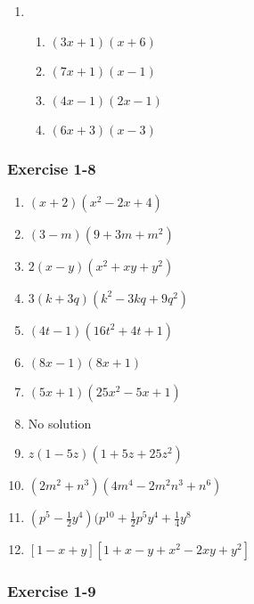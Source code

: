 {\begin{multicols}{3}
\begin{enumerate}[noitemsep, label=\textbf{\arabic*}. ]
\item %

\begin{enumerate}[noitemsep, label=\textbf{(\alph*)} ] 
\item $(3x + 1)(x + 6)$%
\item $(7x + 1)(x - 1)$%
\item $(4x - 1)(2x - 1)$%
\item $(6x + 3)(x - 3)$%
\end{enumerate}

\end{enumerate}

\subsubsection*{Exercise 1-8} %



\begin{enumerate}[noitemsep, label=\textbf{\arabic*}. ] 
\item $(x + 2)(x^2 - 2x + 4)$%
\item $(3 - m)(9 + 3m + m^2)$%
\item $2(x - y)(x^2 + xy + y^2)$%
\item $3(k + 3q)(k^2 - 3kq + 9q^2)$%
\item $(4t - 1)(16t^2 + 4t + 1)$%
\item $(8x - 1)(8x + 1)$%
\item $(5x + 1)(25x^2 - 5x + 1)$%
\item No solution%
\item $z(1 - 5z)(1 + 5z + 25z^2)$%
\item $(2m^2 + n^3)(4m^4 - 2m^2n^3 + n^6)$%
\item $(p^5 - \frac{1}{2} y^4)(p^10 + \frac{1}{2}p^{5}y^{4} + \frac{1}{4}y^8$
\item $[1-x+y][1+x-y+x^2-2xy+y^2]$
\end{enumerate}



\subsubsection*{Exercise 1-9} %




\end{multicols}}

